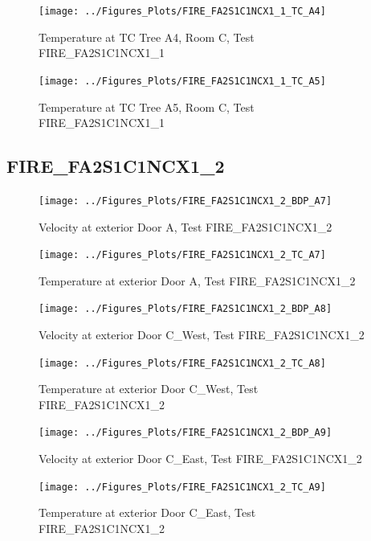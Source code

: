\documentclass[11pt,oneside]{book}
\begin{document}
\begin{figure}[!ht]
\texttt{[image: ../Figures\_Plots/FIRE\_FA2S1C1NCX1\_1\_TC\_A4]}
\caption{Temperature at TC Tree A4, Room C, Test FIRE\_FA2S1C1NCX1\_1}
\label{fig:FIRE_FA2S1C1NCX1_1_TC_A4}
\end{figure}

\begin{figure}[!ht]
\texttt{[image: ../Figures\_Plots/FIRE\_FA2S1C1NCX1\_1\_TC\_A5]}
\caption{Temperature at TC Tree A5, Room C, Test FIRE\_FA2S1C1NCX1\_1}
\label{fig:FIRE_FA2S1C1NCX1_1_TC_A5}
\end{figure}


\clearpage


\subsection{FIRE\_FA2S1C1NCX1\_2}

\begin{figure}[!ht]
\texttt{[image: ../Figures\_Plots/FIRE\_FA2S1C1NCX1\_2\_BDP\_A7]}
\caption{Velocity at exterior Door A, Test FIRE\_FA2S1C1NCX1\_2}
\label{fig:FIRE_FA2S1C1NCX1_2_BDP_A7}
\end{figure}

\begin{figure}[!ht]
\texttt{[image: ../Figures\_Plots/FIRE\_FA2S1C1NCX1\_2\_TC\_A7]}
\caption{Temperature at exterior Door A, Test FIRE\_FA2S1C1NCX1\_2}
\label{fig:FIRE_FA2S1C1NCX1_2_TC_A7}
\end{figure}

\begin{figure}[!ht]
\texttt{[image: ../Figures\_Plots/FIRE\_FA2S1C1NCX1\_2\_BDP\_A8]}
\caption{Velocity at exterior Door C\_West, Test FIRE\_FA2S1C1NCX1\_2}
\label{fig:FIRE_FA2S1C1NCX1_2_BDP_A8}
\end{figure}

\begin{figure}[!ht]
\texttt{[image: ../Figures\_Plots/FIRE\_FA2S1C1NCX1\_2\_TC\_A8]}
\caption{Temperature at exterior Door C\_West, Test FIRE\_FA2S1C1NCX1\_2}
\label{fig:FIRE_FA2S1C1NCX1_2_TC_A8}
\end{figure}

\begin{figure}[!ht]
\texttt{[image: ../Figures\_Plots/FIRE\_FA2S1C1NCX1\_2\_BDP\_A9]}
\caption{Velocity at exterior Door C\_East, Test FIRE\_FA2S1C1NCX1\_2}
\label{fig:FIRE_FA2S1C1NCX1_2_BDP_A9}
\end{figure}

\begin{figure}[!ht]
\texttt{[image: ../Figures\_Plots/FIRE\_FA2S1C1NCX1\_2\_TC\_A9]}
\caption{Temperature at exterior Door C\_East, Test FIRE\_FA2S1C1NCX1\_2}
\label{fig:FIRE_FA2S1C1NCX1_2_TC_A9}
\end{figure}
\end{document}
